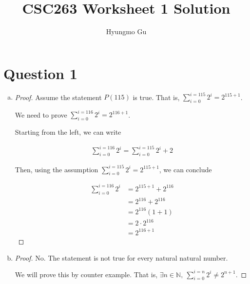 \documentclass[12pt]{article}
\begin{document}
\title{CSC263 Worksheet 1 Solution}
\author{Hyungmo Gu}
\maketitle

\section*{Question 1}
\begin{enumerate}[a.]
    \item

    \begin{proof}
        Assume the statement $P(115)$ is true. That is, $\sum\limits_{i=0}^{i=115} 2^i = 2^{115+1}$.

        \bigskip

        We need to prove $\sum\limits_{i=0}^{i=116} 2^i = 2^{116+1}$.

        \bigskip

        Starting from the left, we can write

        \bigskip

        \begin{align}
            \sum\limits_{i=0}^{i=116} 2^i = \sum\limits_{i=0}^{i=115} 2^i + 2
        \end{align}

        \bigskip

        Then, using the assumption $\sum\limits_{i=0}^{i=115} 2^i = 2^{115+1}$, we
        can conclude

        \begin{align}
            \sum\limits_{i=0}^{i=116} 2^i &= 2^{115+1} + 2^{116}\\
            &= 2^{116} + 2^{116}\\
            &= 2^{116}(1 + 1)\\
            &= 2 \cdot 2^{116}\\
            &= 2^{116+1}
        \end{align}
    \end{proof}

    \item

    \begin{proof}
        No. The statement is not true for every natural natural number.

        \bigskip

        We will prove this by counter example. That is, $\exists n \in \mathbb{N},\:
        \sum\limits_{i=0}^{i=n} 2^i \neq 2^{n+1}$.


\end{proof}
\end{enumerate}
\end{document}

